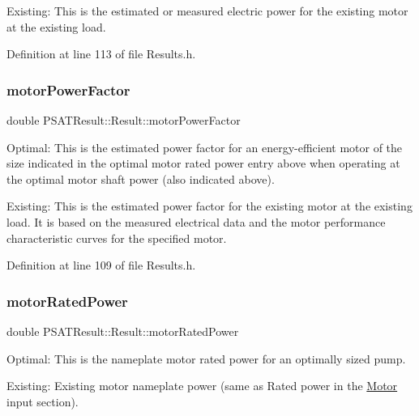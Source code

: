 Existing\+: This is the estimated or measured electric power for the existing motor at the existing load. 

Definition at line 113 of file Results.\+h.

\mbox{\label{struct_p_s_a_t_result_1_1_result_a19ac96991a81b7c4e69b5b37bf05c460}} 
\subsubsection{\texorpdfstring{motor\+Power\+Factor}{motorPowerFactor}}
{\footnotesize\ttfamily double P\+S\+A\+T\+Result\+::\+Result\+::motor\+Power\+Factor}



Optimal\+: This is the estimated power factor for an energy-\/efficient motor of the size indicated in the optimal motor rated power entry above when operating at the optimal motor shaft power (also indicated above). 

Existing\+: This is the estimated power factor for the existing motor at the existing load. It is based on the measured electrical data and the motor performance characteristic curves for the specified motor. 

Definition at line 109 of file Results.\+h.

\mbox{\label{struct_p_s_a_t_result_1_1_result_ae487ec5d7eed6f287f18b4ed15e1b639}} 
\subsubsection{\texorpdfstring{motor\+Rated\+Power}{motorRatedPower}}
{\footnotesize\ttfamily double P\+S\+A\+T\+Result\+::\+Result\+::motor\+Rated\+Power}



Optimal\+: This is the nameplate motor rated power for an optimally sized pump. 

Existing\+: Existing motor nameplate power (same as Rated power in the \hyperlink{struct_motor}{Motor} input section). 

